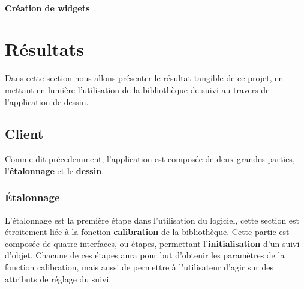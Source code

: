 \documentclass{report}
\begin{document}
				
			\subsubsection{Création de widgets}

	\chapter{Résultats}
		Dans cette section nous allons présenter le résultat tangible de ce projet, en mettant en lumière l'utilisation de la bibliothèque de suivi au travers de l'application de dessin.
			
		
		\section{Client}
			Comme dit précedemment, l'application est composée de deux grandes parties, l'\textbf{étalonnage} et le \textbf{dessin}.
			\subsection{Étalonnage}
				L'étalonnage est la première étape dans l'utilisation du logiciel, cette section est étroitement liée à la fonction \textbf{calibration} de la bibliothèque. Cette partie est composée de quatre interfaces, ou étapes, permettant l'\textbf{initialisation} d'un suivi d'objet. Chacune de ces étapes aura pour but d'obtenir les paramètres de la fonction calibration, mais aussi de permettre à l'utilisateur d'agir sur des attributs de réglage du suivi.
				\newpage
\end{document}
